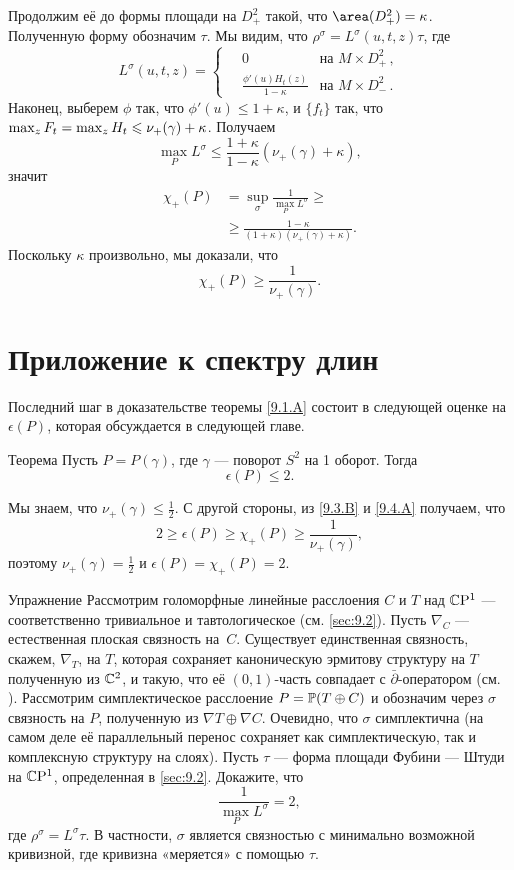Продолжим её до формы площади на $D_+^2$ такой, что $\area (D_+^2) = \kappa$.
Полученную форму обозначим $\tau$.
Мы видим, что $\rho^\sigma = L^\sigma (u, t, z)\tau$, где 
\[
L^\sigma(u,t,z)=
\begin{cases}
\quad0&\text{на\ } M\times D^2_+\,,
\\
\quad\frac{\phi'(u)H_t(z)}{1-\kappa}&\text{на\ } M\times D^2_-\,.
\end{cases}
\]
Наконец, выберем $\phi$ так, что $\phi' (u) \le 1 + \kappa$, и
$\{f_t\}$ так, что $\max_z F_t \z= \max_z H_t \le \nu_+ (\gamma) +
\kappa$. 
Получаем
\[\max_P L^\sigma \le  \frac{1+\kappa}{1-\kappa} (\nu_+ (\gamma) + \kappa),\]
значит 
\begin{align*}
\chi_+ (P) &= \sup_\sigma \frac1{\max_PL^\sigma}\ge
\\
&\ge\frac{1-\kappa}{(1 + \kappa)(\nu_+ (\gamma) + \kappa)}. 
\end{align*}
Поскольку $\kappa$ произвольно, мы доказали, что 
\[\chi_+ (P) \ge \frac{1}{\nu_+ (\gamma)}.\]
\qeds

\section{Приложение к спектру длин}\label{sec:9.4}

Последний шаг в доказательстве теоремы \ref{9.1.A} состоит в следующей
оценке на $\epsilon(P)$, которая обсуждается в следующей главе.


\begin{thm}{Теорема}\label{9.4.A}
Пусть $P = P(\gamma)$, где $\gamma$ — поворот $S^2$ на 1 оборот.
Тогда
\[\epsilon(P) \le 2.\]
\end{thm}

Мы знаем, что $\nu_+ (\gamma) \le \tfrac12$.
С другой стороны, из \ref{9.3.B} и \ref{9.4.A} получаем, что
\[2 \ge \epsilon(P) \ge \chi_+ (P) \ge\frac1{\nu_+(\gamma)},\]
поэтому $\nu_+ (\gamma) = \tfrac12$ и $\epsilon(P) = \chi_+ (P) = 2$.
\qeds

\begin{ex}{Упражнение}
Рассмотрим голоморфные линейные расслоения $C$ и $T$ над $\mathbb{C}\mathrm{P}^1$ —
соответственно тривиальное и тавтологическое (см. \ref{sec:9.2}). 
Пусть $\nabla_C$ — естественная плоская связность на~$C$.
Существует единственная связность, скажем, $\nabla_T$, на $T$, которая
сохраняет каноническую эрмитову структуру  на $T$ полученную из
$\mathbb{C}^2$, и такую, что её $(0,1)$-часть совпадает с
$\bar\partial$-оператором (см. \cite{GH}). 
Рассмотрим симплектическое расслоение $P = \mathbb{P}(T \oplus C)$ и
обозначим через $\sigma$ связность на $P$, полученную из $\nabla T
\oplus \nabla C$. 
Очевидно, что $\sigma$ симплектична (на самом деле её параллельный
перенос сохраняет как симплектическую, так и комплексную структуру на
слоях). 
Пусть $\tau$ — форма площади Фубини — Штуди на $\mathbb{C}\mathrm{P}^1$,
определенная в \ref{sec:9.2}. 
Докажите, что 
\[\frac1{\max_P L^\sigma}=2,\]
где $\rho^\sigma = L^\sigma \tau$.
В частности, $\sigma$ является связностью с минимально возможной
кривизной, где кривизна «меряется» с  помощью $\tau$.  
\end{ex}
